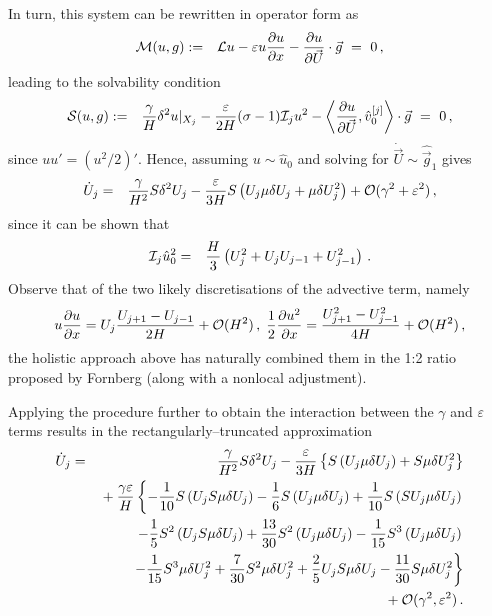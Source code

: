 \documentclass[12pt,a5paper]{article}
\begin{document}
In turn, this system can be rewritten in operator form as
\begin{eqnarray}
{\cal M}(u,g) & := & {\cal L}u-\varepsilon u\D xu-\D{\vec{U}}{u}\cdot\vec{g}~=~0\,,
\label{eq:Mug:AD}
\end{eqnarray}
leading to the solvability condition
\begin{eqnarray}
       {\cal S}(u,g) & := & 
          \frac{\gamma}{H}\delta^2u|_{X_j} - \frac{\varepsilon}{2H}(\sigma-1){\cal I}_j u^2
	-\left\langle\D {\vec U}u,\hat{v}_0^{[j]}\right\rangle\cdot\vec{g}~=~0 \,,
\label{eq:Sug}
\end{eqnarray}
since $uu'=(u^2/2)'$.
Hence, assuming $u\sim\hat{u}_0$ and solving for $\dot{\vec{U}}\sim\hat{\vec{g}}_1$ gives
\begin{eqnarray}
	\dot{U}_j & = & \frac{\gamma}{H^2}S\delta^2 U_j
- \frac{\varepsilon}{3H}S\left(U_j\mu\delta U_j+\mu\delta U^2_j\right)+{\cal O}(\gamma^2+\varepsilon^2)\,,
\end{eqnarray}
since it can be shown that
\begin{eqnarray}
{\cal I}_j\hat{u}_0^2 & = & \frac{H}{3}\left(U_j^2+U_jU_{j-1}+U_{j-1}^2\right)\,.
\end{eqnarray}
Observe that of the two likely discretisations of the advective term, namely
\begin{eqnarray}
u\D xu = U_j\frac{U_{j+1}-U_{j-1}}{2H}+{\cal O}(H^2)\,,\;
\frac{1}{2}\D x{u^2} = \frac{U_{j+1}^2-U_{j-1}^2}{4H}+{\cal O}(H^2)\,,
\end{eqnarray}
the holistic approach above has naturally combined them in the 1:2 ratio proposed by Fornberg (along with a nonlocal adjustment).

Applying the procedure further to obtain the interaction between the $\gamma$ and $\varepsilon$ terms results in the 
rectangularly--truncated approximation
\begin{eqnarray}
	\dot{U}_j & = & \frac{\gamma}{H^2}S\delta^2 U_j
- \frac{\varepsilon}{3H}\left\{S\left(U_j\mu\delta U_j\right)+S\mu\delta U^2_j\right\}
\nonumber\\
&& {}+ \frac{\gamma\varepsilon}{H}\left\{
  - \frac{1}{10}S\left(U_{j} S\mu\delta U_{j}\right)
  - \frac{1}{6}S\left(U_{j} \mu\delta U_{j}\right)
  + \frac{1}{10}S\left(SU_{j} \mu\delta U_{j}\right)
  \right.
\nonumber\\  
&& \left.- \frac{1}{5}S^{2}\left(U_{j} S\mu\delta U_{j}\right)
  + \frac{13}{30}S^{2}\left(U_{j} \mu\delta U_{j}\right)
  - \frac{1}{15}S^{3}\left(U_{j} \mu\delta U_{j}\right)
  \right.
\nonumber\\
&& \left.
  - \frac{1}{15}S^{3}\mu\delta U_{j}^2
  + \frac{7}{30}S^{2}\mu\delta U_{j}^2
  + \frac{2}{5}U_{j} S\mu\delta U_{j}
  - \frac{11}{30}S\mu\delta U_{j}^2
\right\}
\nonumber\\
&&{}+{\cal O}(\gamma^2,\varepsilon^2)
\,.
\end{eqnarray}
\end{document}
